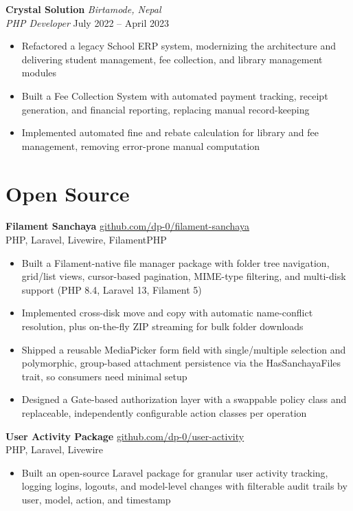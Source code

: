 \documentclass[10pt, a4paper]{article}
\newcommand{\role}[4]{%
    \noindent
    \textbf{#2} \hfill \textit{#3} \\
    \textit{#1} \hfill #4
    \vspace{2pt}
}
\begin{document}
\role{PHP Developer}{Crystal Solution}{Birtamode, Nepal}{July 2022 -- April 2023}
\begin{itemize}
    \item Refactored a legacy School ERP system, modernizing the architecture and delivering student management, fee collection, and library management modules
    \item Built a Fee Collection System with automated payment tracking, receipt generation, and financial reporting, replacing manual record-keeping
    \item Implemented automated fine and rebate calculation for library and fee management, removing error-prone manual computation
\end{itemize}

\section{Open Source}

\noindent
\textbf{Filament Sanchaya}
\hfill
\href{https://github.com/dp-0/filament-sanchaya}{github.com/dp-0/filament-sanchaya} \\
PHP, Laravel, Livewire, FilamentPHP

\vspace{2pt}
\begin{itemize}
    \item Built a Filament-native file manager package with folder tree navigation, grid/list views, cursor-based pagination, MIME-type filtering, and multi-disk support (PHP 8.4, Laravel 13, Filament 5)
    \item Implemented cross-disk move and copy with automatic name-conflict resolution, plus on-the-fly ZIP streaming for bulk folder downloads
    \item Shipped a reusable MediaPicker form field with single/multiple selection and polymorphic, group-based attachment persistence via the HasSanchayaFiles trait, so consumers need minimal setup
    \item Designed a Gate-based authorization layer with a swappable policy class and replaceable, independently configurable action classes per operation
\end{itemize}

\vspace{6pt}

\noindent
\textbf{User Activity Package} \enspace [archived]
\hfill
\href{https://github.com/dp-0/user-activity}{github.com/dp-0/user-activity} \\
PHP, Laravel, Livewire
\vspace{2pt}
\begin{itemize}
    \item Built an open-source Laravel package for granular user activity tracking, logging logins, logouts, and model-level changes with filterable audit trails by user, model, action, and timestamp
\end{itemize}
\end{document}

